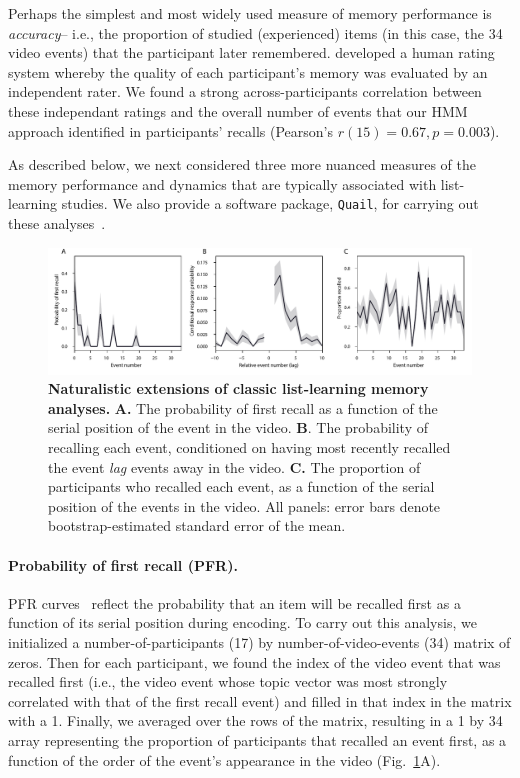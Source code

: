 \documentclass{article}
\begin{document}
Perhaps the simplest and most widely used measure of memory performance is \textit{accuracy}-- i.e., the proportion of studied (experienced) items (in this case, the 34 video events) that the participant later remembered.  \cite{ChenEtal17} developed a human rating system whereby the quality of each participant's memory was evaluated by an independent rater.  We found a strong across-participants correlation between these independant ratings and the overall number of events that our HMM approach identified in participants' recalls (Pearson's $r(15) = 0.67, p = 0.003$).

As described below, we next considered three more nuanced measures of the memory performance and dynamics that are typically associated with list-learning studies.  We also provide a software package, \texttt{Quail}, for carrying out these analyses~\citep{HeusEtal17b}.

\begin{figure}[p!]
\centering
\includegraphics[width=1\textwidth]{figs/list_learning}
\caption{\small \textbf{Naturalistic extensions of classic list-learning memory analyses.} \textbf{A.} The probability of first recall as a function of the serial position of the event in the video. \textbf{B}.  The probability of recalling each event, conditioned on having most recently recalled the event \textit{lag} events away in the video.  \textbf{C.} The proportion of participants who recalled each event, as a function of the serial position of the events in the video.  All panels: error bars denote bootstrap-estimated standard error of the mean.}
\label{fig:list-learning}
\end{figure}

\paragraph{Probability of first recall (PFR).}  PFR curves~\citep{WelcBurn24, PostPhil65, AtkiShif68} reflect the probability that an item will be recalled first as a function of its serial position during encoding. To carry out this analysis, we initialized a number-of-participants (17) by number-of-video-events (34) matrix of zeros. Then for each participant, we found the index of the video event that was recalled first (i.e., the video event whose topic vector was most strongly correlated with that of the first recall event) and filled in that index in the matrix with a 1.  Finally, we averaged over the rows of the matrix, resulting in a 1 by 34 array representing the proportion of participants that recalled an event first, as a function of the order of the event's appearance in the video (Fig.~\ref{fig:list-learning}A).
\end{document}
